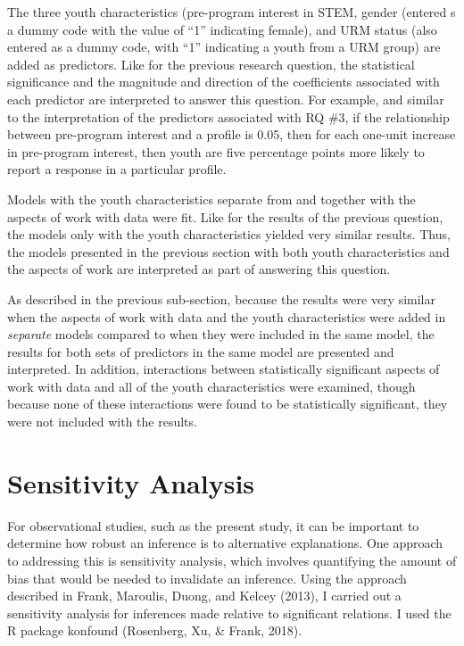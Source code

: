 \documentclass[]{msu-thesis}
\theoremstyle{definition}
\theoremstyle{definition}
\theoremstyle{definition}
\theoremstyle{remark}
\begin{document}
The three youth characteristics (pre-program interest in STEM, gender
(entered s a dummy code with the value of ``1'' indicating female), and
URM status (also entered as a dummy code, with ``1'' indicating a youth
from a URM group) are added as predictors. Like for the previous
research question, the statistical significance and the magnitude and
direction of the coefficients associated with each predictor are
interpreted to answer this question. For example, and similar to the
interpretation of the predictors associated with RQ \#3, if the
relationship between pre-program interest and a profile is 0.05, then
for each one-unit increase in pre-program interest, then youth are five
percentage points more likely to report a response in a particular
profile.

Models with the youth characteristics separate from and together with
the aspects of work with data were fit. Like for the results of the
previous question, the models only with the youth characteristics
yielded very similar results. Thus, the models presented in the previous
section with both youth characteristics and the aspects of work are
interpreted as part of answering this question.

As described in the previous sub-section, because the results were very
similar when the aspects of work with data and the youth characteristics
were added in \emph{separate} models compared to when they were included
in the same model, the results for both sets of predictors in the same
model are presented and interpreted. In addition, interactions between
statistically significant aspects of work with data and all of the youth
characteristics were examined, though because none of these interactions
were found to be statistically significant, they were not included with
the results.

\section{Sensitivity Analysis}\label{sensitivity-analysis}

For observational studies, such as the present study, it can be
important to determine how robust an inference is to alternative
explanations. One approach to addressing this is sensitivity analysis,
which involves quantifying the amount of bias that would be needed to
invalidate an inference. Using the approach described in Frank,
Maroulis, Duong, and Kelcey (2013), I carried out a sensitivity analysis
for inferences made relative to significant relations. I used the R
package konfound (Rosenberg, Xu, \& Frank, 2018).
\end{document}
